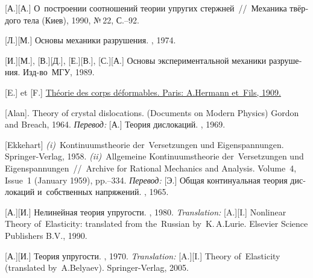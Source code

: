 \begin{thebibliography}{123}
\begin{otherlanguage}{russian}
[А.][А.] О~построении соотношений теории упругих стержней~//~Механика твёрдого тела (Киев), 1990, №\,22, С.\hbox{--}92.

[Л.][М.] Основы механики разрушения. \naukapublisher, 1974. 

[И.][М.], [В.][Д.], [Е.][В.], [С.][А.]
Основы экспериментальной механики разрушения. Изд\hbox{-}во~МГУ, 1989. 

[E.] et [F.] \href{https://jscholarship.library.jhu.edu/bitstream/handle/1774.2/34209/31151000327233.pdf}{Théorie des corps déformables. Paris: A.\:Hermann et~Fils, 1909.} 

[Alan]. Theory of crystal dislocations. (Documents on Modern Physics) Gordon and Breach, 1964. 
\emph{Перевод:} [А.] Теория дислокаций. \mirpublisher, 1969. 

[Ekkehart] \emph{(i)}~Kontinuumstheorie der~Versetzungen und Eigen\-spannung\-en. Springer\hbox{-}Verlag, 1958. 
\emph{(ii)}~Allgemeine Kontinuumstheorie der~Versetzungen und Eigen\-span\-nung\-en~//~Archive for Rational Mechanics and Analysis. Volume~4, Issue~1 (January 1959), pp.\hbox{--}334.
\emph{Перевод:} [Э.] Общая континуальная теория дислокаций и~собственных напряжений. \mirpublisher, 1965. 

[А.][И.] Нелинейная теория упругости. \naukapublisher, 1980. 
\emph{Translation:}
[A.][I.] Nonlinear Theory of~Elasticity: translated from the~Russian by~K.\,A.\;Lurie. Elsevier Science Publishers B.\hspace{.1ex}V\hspace{-0.2ex}., 1990. 

[А.][И.] Теория упругости. \naukapublisher, 1970. 
\emph{Translation:}
[A.][I.] Theory of~Elasticity (translated by~A.\:Belyaev). Springer-Verlag, 2005. 


\end{otherlanguage}
\end{thebibliography}
